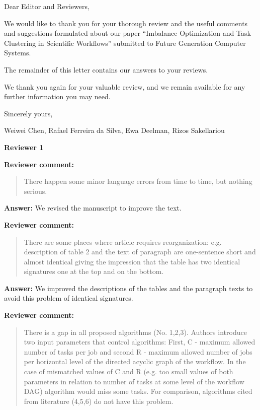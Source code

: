 \documentclass{letter}
\date{July 31st 2014}
\newenvironment{review}%
{\textbf{Reviewer comment:}\begin{quote}}%
{\end{quote}}%
\newcommand{\answer}[1]{%
      \textbf{Answer:} #1}
\begin{document}
\begin{letter}{}

\opening{Dear Editor and Reviewers,}

We would like to thank you for your thorough review and the useful
comments and suggestions formulated about our paper ``Imbalance Optimization and Task Clustering in Scientific Workflows'' submitted to
Future Generation Computer Systems.

The remainder of this letter contains our answers to your reviews. 

We thank you again for your valuable review, and we remain available for any further information you may need.

\vspace{0.5cm}

Sincerely yours,

\vspace{1cm}

Weiwei Chen, Rafael Ferreira da Silva, Ewa Deelman, Rizos Sakellariou

\newpage

\textbf{Reviewer 1}


\begin{review}
There happen some minor language errors from time to time, but nothing serious. 
\end{review}

\answer{We revised the manuscript to improve the text.}


\begin{review}
There are some places where article requires reorganization: e.g. description of table 2 and the text of paragraph are one-sentence short and almost identical giving the impression that the table has two identical signatures one at the top and on the bottom. 
\end{review}

\answer{We improved the descriptions of the tables and the paragraph texts to avoid this problem of identical signatures.}


\begin{review}
There is a gap in all proposed algorithms (No. 1,2,3). Authors introduce two input parameters that control algorithms: First, C - maximum allowed number of tasks per job and second R - maximum allowed number of jobs per horizontal level of the directed acyclic graph of  the workflow. In the case of mismatched values of C and R (e.g. too small values of both parameters in relation to number of tasks at some level of the workflow DAG) algorithm would miss some tasks. For comparison, algorithms cited from literature (4,5,6) do not have this problem.
\end{review}


\end{letter}
\end{document}
